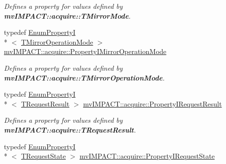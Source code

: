 \begin{DoxyCompactItemize}
\begin{DoxyCompactList}\small\item\em Defines a property for values defined by {\bfseries mv\+I\+M\+P\+A\+C\+T\+::acquire\+::\+T\+Mirror\+Mode}. \end{DoxyCompactList}\item 
\hypertarget{group___common_interface_gaeb7e2fadc87b5bf53e5ba09c3255a276}{typedef \hyperlink{classmv_i_m_p_a_c_t_1_1acquire_1_1_enum_property_i}{Enum\+Property\+I}\\*
$<$ \hyperlink{group___common_interface_ga5bb7986788cc889f815644ba1dab1c46}{T\+Mirror\+Operation\+Mode} $>$ \hyperlink{group___common_interface_gaeb7e2fadc87b5bf53e5ba09c3255a276}{mv\+I\+M\+P\+A\+C\+T\+::acquire\+::\+Property\+I\+Mirror\+Operation\+Mode}}\label{group___common_interface_gaeb7e2fadc87b5bf53e5ba09c3255a276}

\begin{DoxyCompactList}\small\item\em Defines a property for values defined by {\bfseries mv\+I\+M\+P\+A\+C\+T\+::acquire\+::\+T\+Mirror\+Operation\+Mode}. \end{DoxyCompactList}\item 
\hypertarget{group___common_interface_ga1589b24b307be9af82ada97e4588a6bd}{typedef \hyperlink{classmv_i_m_p_a_c_t_1_1acquire_1_1_enum_property_i}{Enum\+Property\+I}\\*
$<$ \hyperlink{group___common_interface_gab6148762ea638f8eabbabfc9468b0d4c}{T\+Request\+Result} $>$ \hyperlink{group___common_interface_ga1589b24b307be9af82ada97e4588a6bd}{mv\+I\+M\+P\+A\+C\+T\+::acquire\+::\+Property\+I\+Request\+Result}}\label{group___common_interface_ga1589b24b307be9af82ada97e4588a6bd}

\begin{DoxyCompactList}\small\item\em Defines a property for values defined by {\bfseries mv\+I\+M\+P\+A\+C\+T\+::acquire\+::\+T\+Request\+Result}. \end{DoxyCompactList}\item 
\hypertarget{group___common_interface_gaa47cf118ef2a24f22680d3a3b2fcdf60}{typedef \hyperlink{classmv_i_m_p_a_c_t_1_1acquire_1_1_enum_property_i}{Enum\+Property\+I}\\*
$<$ \hyperlink{group___common_interface_gacaa15d9102d56c38e659c31c678a640d}{T\+Request\+State} $>$ \hyperlink{group___common_interface_gaa47cf118ef2a24f22680d3a3b2fcdf60}{mv\+I\+M\+P\+A\+C\+T\+::acquire\+::\+Property\+I\+Request\+State}}\label{group___common_interface_gaa47cf118ef2a24f22680d3a3b2fcdf60}


\end{DoxyCompactItemize}
